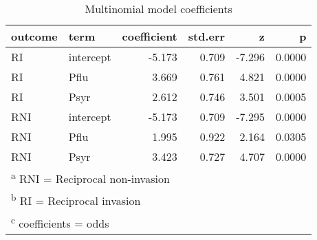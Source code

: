 \begin{table}

\caption{Multinomial model coefficients}
\centering
\begin{tabular}[t]{llrrrr}
\toprule
outcome & term & coefficient & std.err & z & p\\
\midrule
RI & intercept & -5.173 & 0.709 & -7.296 & 0.0000\\
RI & Pflu & 3.669 & 0.761 & 4.821 & 0.0000\\
RI & Psyr & 2.612 & 0.746 & 3.501 & 0.0005\\
RNI & intercept & -5.173 & 0.709 & -7.295 & 0.0000\\
RNI & Pflu & 1.995 & 0.922 & 2.164 & 0.0305\\
\addlinespace
RNI & Psyr & 3.423 & 0.727 & 4.707 & 0.0000\\
\bottomrule
\multicolumn{6}{l}{\textsuperscript{a} RNI = Reciprocal non-invasion}\\
\multicolumn{6}{l}{\textsuperscript{b} RI = Reciprocal invasion}\\
\multicolumn{6}{l}{\textsuperscript{c} coefficients = odds}\\
\end{tabular}
\end{table}